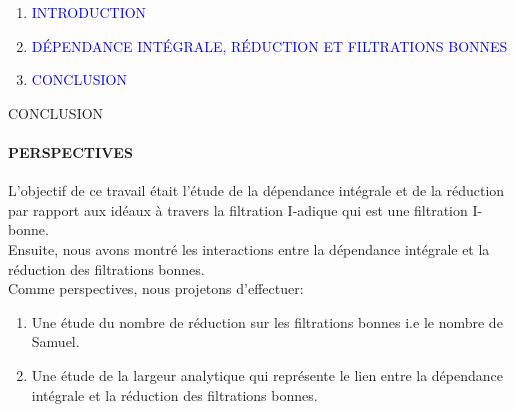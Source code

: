 \documentclass[11pt,a4paper]{beamer}
\begin{document}
\begin{frame}
	\begin{enumerate}
		\item<0> \textcolor{blue}{INTRODUCTION}\\
		\item<0> \textcolor{blue}{DÉPENDANCE INTÉGRALE, RÉDUCTION ET FILTRATIONS BONNES }\\
		\item<1> \textcolor{blue}{CONCLUSION}\\
	\end{enumerate}
\end{frame}

\begin{frame}{CONCLUSION}
	\framesubtitle{PERSPECTIVES}
	\begin{block}{}	
L'objectif de ce travail était l'étude de la dépendance intégrale et de la réduction par rapport aux idéaux à travers la filtration I-adique qui est une filtration I-bonne. \\
Ensuite, nous avons montré les interactions entre la dépendance intégrale et la réduction des filtrations bonnes.\\

Comme perspectives, nous projetons d'effectuer:\\
		\begin{enumerate}
			\item Une étude du nombre de réduction sur les filtrations bonnes i.e le nombre de Samuel.
			\item Une étude de la largeur analytique qui représente le lien entre la dépendance intégrale et la réduction des filtrations bonnes.
		\end{enumerate}
	\end{block}
\end{frame}

\end{document}
